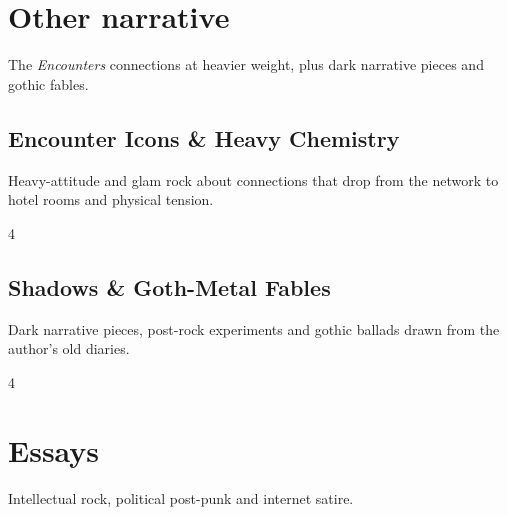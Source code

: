 \documentclass[a4paper,landscape]{memoir}
\begin{document}
\part{Other narrative}
The \emph{Encounters} connections at heavier weight, plus dark narrative pieces and gothic fables.

\chapter{Encounter Icons \& Heavy Chemistry}
Heavy-attitude and glam rock about connections that drop from the network to hotel rooms and physical tension.
\clearpage\begin{multicols*}{4}
\end{multicols*}

\chapter{Shadows \& Goth-Metal Fables}
Dark narrative pieces, post-rock experiments and gothic ballads drawn from the author’s old diaries.
\clearpage\begin{multicols*}{4}
\end{multicols*}

\part{Essays}
Intellectual rock, political post-punk and internet satire.
\end{document}
